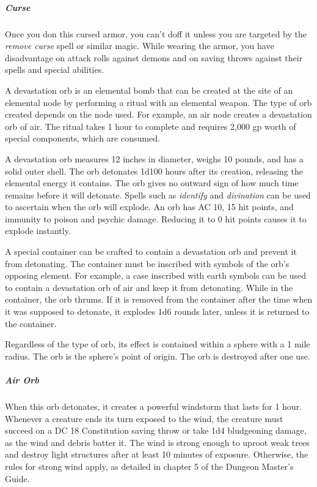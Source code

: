 \documentclass[10pt,a4paper,twoside,bg=print,twocolumn,openany,nodeprecatedcode]{dndbook}
\begin{document}
\subparagraph{Curse}
Once you don this cursed armor, you can't doff it unless you are targeted by the \textit{remove curse} spell or similar magic. While wearing the armor, you have disadvantage on attack rolls against demons and on saving throws against their spells and special abilities.

A devastation orb is an elemental bomb that can be created at the site of an elemental node by performing a ritual with an elemental weapon. The type of orb created depends on the node used. For example, an air node creates a devastation orb of air. The ritual takes 1 hour to complete and requires 2,000 gp worth of special components, which are consumed.

A devastation orb measures 12 inches in diameter, weighs 10 pounds, and has a solid outer shell. The orb detonates 1d100 hours after its creation, releasing the elemental energy it contains. The orb gives no outward sign of how much time remains before it will detonate. Spells such as \textit{identify} and \textit{divination} can be used to ascertain when the orb will explode. An orb has AC 10, 15 hit points, and immunity to poison and psychic damage. Reducing it to 0 hit points causes it to explode instantly.

A special container can be crafted to contain a devastation orb and prevent it from detonating. The container must be inscribed with symbols of the orb's opposing element. For example, a case inscribed with earth symbols can be used to contain a devastation orb of air and keep it from detonating. While in the container, the orb thrums. If it is removed from the container after the time when it was supposed to detonate, it explodes 1d6 rounds later, unless it is returned to the container.

Regardless of the type of orb, its effect is contained within a sphere with a 1 mile radius. The orb is the sphere's point of origin. The orb is destroyed after one use.

\subparagraph{Air Orb}
When this orb detonates, it creates a powerful windstorm that lasts for 1 hour. Whenever a creature ends its turn exposed to the wind, the creature must succeed on a DC 18 Constitution saving throw or take 1d4 bludgeoning damage, as the wind and debris batter it. The wind is strong enough to uproot weak trees and destroy light structures after at least 10 minutes of exposure. Otherwise, the rules for strong wind apply, as detailed in chapter 5 of the Dungeon Master's Guide.
\end{document}
